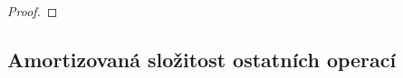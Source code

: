 \begin{proof}
%
%
%
%
%
%
%
%
%
%  
%  

\end{proof}





\subsection{Amortizovaná složitost ostatních operací}

